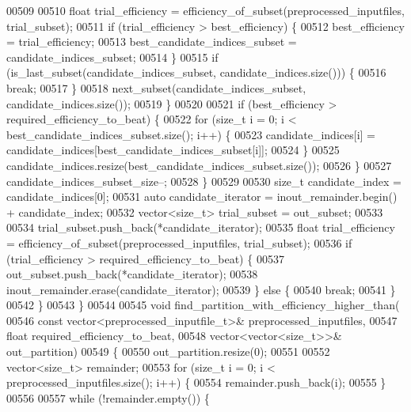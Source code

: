\begin{DoxyCode}
{{00509         
00510         \textcolor{keywordtype}{float} trial\_efficiency = efficiency\_of\_subset(preprocessed\_inputfiles, trial\_subset);
00511         \textcolor{keywordflow}{if} (trial\_efficiency > best\_efficiency) \{
00512           best\_efficiency = trial\_efficiency;
00513           best\_candidate\_indices\_subset = candidate\_indices\_subset;
00514         \}
00515         \textcolor{keywordflow}{if} (is\_last\_subset(candidate\_indices\_subset, candidate\_indices.size())) \{
00516           \textcolor{keywordflow}{break};
00517         \}
00518         next\_subset(candidate\_indices\_subset, candidate\_indices.size());
00519       \}
00520        
00521       \textcolor{keywordflow}{if} (best\_efficiency > required\_efficiency\_to\_beat) \{
00522         \textcolor{keywordflow}{for} (\textcolor{keywordtype}{size\_t} i = 0; i < best\_candidate\_indices\_subset.size(); i++) \{
00523           candidate\_indices[i] = candidate\_indices[best\_candidate\_indices\_subset[i]];
00524         \}
00525         candidate\_indices.resize(best\_candidate\_indices\_subset.size());
00526       \}
00527       candidate\_indices\_subset\_size--;
00528     \}
00529       
00530     \textcolor{keywordtype}{size\_t} candidate\_index = candidate\_indices[0];
00531     \textcolor{keyword}{auto} candidate\_iterator = inout\_remainder.begin() + candidate\_index;
00532     vector<size\_t> trial\_subset = out\_subset;
00533 
00534     trial\_subset.push\_back(*candidate\_iterator);
00535     \textcolor{keywordtype}{float} trial\_efficiency = efficiency\_of\_subset(preprocessed\_inputfiles, trial\_subset);
00536     \textcolor{keywordflow}{if} (trial\_efficiency > required\_efficiency\_to\_beat) \{
00537       out\_subset.push\_back(*candidate\_iterator);
00538       inout\_remainder.erase(candidate\_iterator);
00539     \} \textcolor{keywordflow}{else} \{
00540       \textcolor{keywordflow}{break};
00541     \}
00542   \}
00543 \}
00544 
00545 \textcolor{keywordtype}{void} find\_partition\_with\_efficiency\_higher\_than(
00546        \textcolor{keyword}{const} vector<preprocessed\_inputfile\_t>& preprocessed\_inputfiles,
00547        \textcolor{keywordtype}{float} required\_efficiency\_to\_beat,
00548        vector<vector<size\_t>>& out\_partition)
00549 \{
00550   out\_partition.resize(0);
00551 
00552   vector<size\_t> remainder;
00553   \textcolor{keywordflow}{for} (\textcolor{keywordtype}{size\_t} i = 0; i < preprocessed\_inputfiles.size(); i++) \{
00554     remainder.push\_back(i);
00555   \}
00556 
00557   \textcolor{keywordflow}{while} (!remainder.empty()) \{
}}
\end{DoxyCode}
